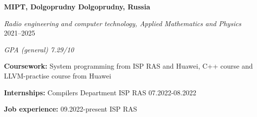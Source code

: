 \textbf{MIPT, Dolgoprudny \hfill Dolgoprudny, Russia} \par
\textit{Radio engineering and computer technology, Applied Mathematics and Physics} \hfill 2021--2025\par
\textit{GPA (general) 7.29/10} \par
\textbf{Coursework:} System programming from ISP RAS and Huawei, C++ course and LLVM-practise course from Huawei\par
\textbf{Internships:} Compilers Department ISP RAS 07.2022-08.2022 \par
\textbf{Job experience:} 09.2022-present ISP RAS